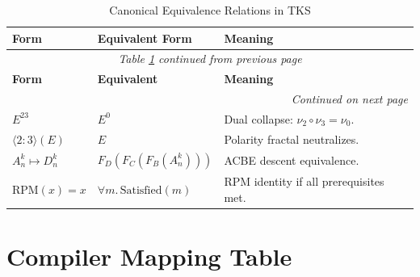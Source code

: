 \renewcommand{\arraystretch}{1.25}
\small
\begin{longtable}{p{2.5cm}|p{3.5cm}|p{5.5cm}}
\caption{Canonical Equivalence Relations in TKS}
\label{tab:canonical-equivalence} \\
\toprule
\textbf{Form}
& \textbf{Equivalent Form}
& \textbf{Meaning}
\\
\midrule
\endfirsthead
\multicolumn{3}{c}{\textit{Table \ref{tab:canonical-equivalence} continued from previous page}} \\
\toprule
\textbf{Form}
& \textbf{Equivalent}
& \textbf{Meaning}
\\
\midrule
\endhead
\midrule
\multicolumn{3}{r}{\textit{Continued on next page}} \\
\endfoot
\bottomrule
\endlastfoot

$E^{23}$ & $E^{0}$ &
Dual collapse: $\nu_2\circ\nu_3 = \nu_0$. \\

$\langle 2:3 \rangle(E)$ & $E$ &
Polarity fractal neutralizes. \\

$A_n^{k} \mapsto D_n^{k}$ & $F_D(F_C(F_B(A_n^{k})))$ &
ACBE descent equivalence. \\

$\text{RPM}(x) = x$ & $\forall m.\, \text{Satisfied}(m)$ &
RPM identity if all prerequisites met. \\

\end{longtable}
\normalsize

\section{Compiler Mapping Table}


